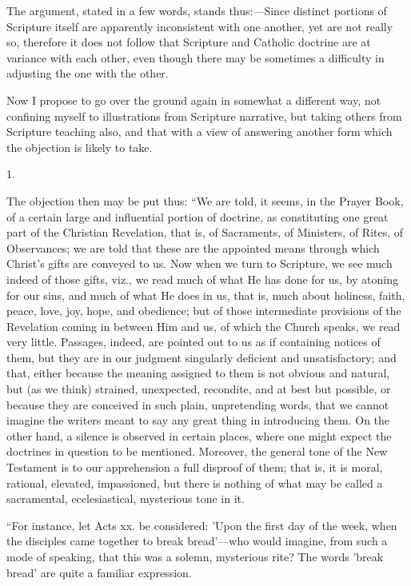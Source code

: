 The argument, stated in a few words, stands thus:—Since distinct
portions of Scripture itself are apparently inconsistent with one
another, yet are not really so, therefore it does not follow
that Scripture and Catholic doctrine are at variance with each other,
even though there may be sometimes a difficulty in adjusting the one
with the other.

Now I propose to go over the ground again in somewhat a different
way, not confining myself to illustrations from Scripture narrative,
but taking others from Scripture teaching also, and that with a view
of answering another form which the objection is likely to take.

1.

The objection then may be put thus: ``We are told, it seems, in
the Prayer Book, of a certain large and influential portion of
doctrine, as constituting one great part of the Christian Revelation,
that is, of Sacraments, of Ministers, of Rites, of Observances; we are
told that these are the appointed means through which Christ's gifts
are conveyed to us. Now when we turn to Scripture, we see much indeed
of those gifts, viz., we read much of what He has done for us, by
atoning for our sins, and much of what He does in us, that is, much
about holiness, faith, peace, love, joy, hope, and obedience; but of
those intermediate provisions of the Revelation coming in between Him
and us, of which the Church speaks, we read very little. Passages,
indeed, are pointed out to us as if containing notices of them, but
they are in our judgment singularly deficient and unsatisfactory; and
that, either because the meaning assigned to them is not obvious and
natural, but (as we think) strained, unexpected, recondite, and at
best but possible, or because they are conceived in such plain,
unpretending words, that we cannot imagine the writers meant to say
any great thing in introducing them. On the other hand, a silence is
observed in certain places, where one might expect the doctrines
in question to be mentioned. Moreover, the general tone of the New
Testament is to our apprehension a full disproof of them; that is, it
is moral, rational, elevated, impassioned, but there is nothing of
what may be called a sacramental, ecclesiastical, mysterious tone in
it.

``For instance, let Acts xx. be considered: 'Upon the first day
of the week, when the disciples came together to break bread'—who
would imagine, from such a mode of speaking, that this was a solemn,
mysterious rite? The words 'break bread' are quite a familiar
expression.

